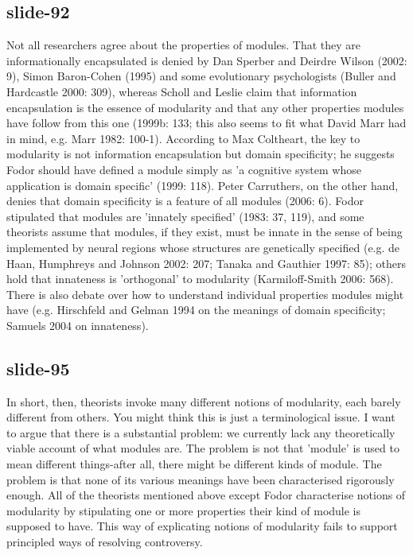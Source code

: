 \documentclass[12pt,\papersize]{extarticle}
\begin{document}
 
\subsection{slide-92}
Not all researchers agree about the properties of modules. That they are informationally encapsulated is denied by Dan Sperber and Deirdre Wilson (2002: 9), Simon Baron-Cohen (1995) and some evolutionary psychologists (Buller and Hardcastle 2000: 309), whereas Scholl and Leslie claim that information encapsulation is the essence of modularity and that any other properties modules have follow from this one (1999b: 133; this also seems to fit what David Marr had in mind, e.g. Marr 1982: 100-1). According to Max Coltheart, the key to modularity is not information encapsulation but domain specificity; he suggests Fodor should have defined a module simply as 'a cognitive system whose application is domain specific' (1999: 118). Peter Carruthers, on the other hand, denies that domain specificity is a feature of all modules (2006: 6). Fodor stipulated that modules are 'innately specified' (1983: 37, 119), and some theorists assume that modules, if they exist, must be innate in the sense of being implemented by neural regions whose structures are genetically specified (e.g. de Haan, Humphreys and Johnson 2002: 207; Tanaka and Gauthier 1997: 85); others hold that innateness is 'orthogonal' to modularity (Karmiloff-Smith 2006: 568). There is also debate over how to understand individual properties modules might have (e.g. Hirschfeld and Gelman 1994 on the meanings of domain specificity; Samuels 2004 on innateness).
 
 
\subsection{slide-95}
In short, then, theorists invoke many different notions of modularity, each barely different from others. You might think this is just a terminological issue. I want to argue that there is a substantial problem: we currently lack any theoretically viable account of what modules are. The problem is not that 'module' is used to mean different things-after all, there might be different kinds of module. The problem is that none of its various meanings have been characterised rigorously enough. All of the theorists mentioned above except Fodor characterise notions of modularity by stipulating one or more properties their kind of module is supposed to have. This way of explicating notions of modularity fails to support principled ways of resolving controversy.
 
\end{document}
